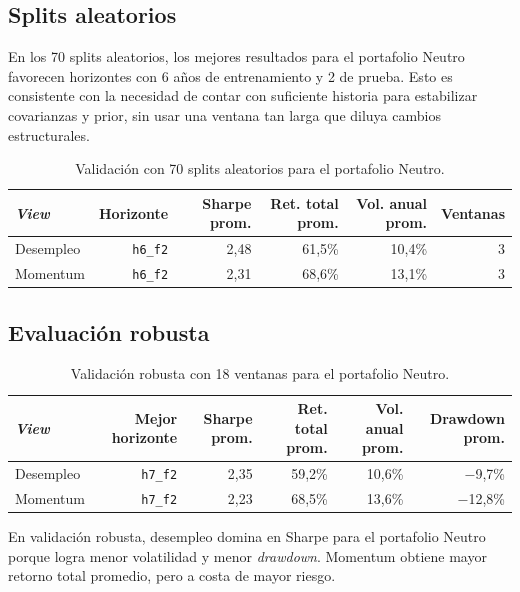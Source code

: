 \subsection*{Splits aleatorios}

En los 70 splits aleatorios, los mejores resultados para el portafolio Neutro
favorecen horizontes con 6 a\~nos de entrenamiento y 2 de prueba. Esto es
consistente con la necesidad de contar con suficiente historia para estabilizar
covarianzas y prior, sin usar una ventana tan larga que diluya cambios
estructurales.

\begin{table}[H]
\centering
\caption{Validaci\'on con 70 splits aleatorios para el portafolio Neutro.}
\label{tab:anexo4_bl_splits}
\small
\begin{tabular}{@{}lrrrrr@{}}
\toprule
\textit{View} & Horizonte & Sharpe prom. & Ret. total prom. & Vol. anual prom. & Ventanas \\
\midrule
Desempleo & \texttt{h6\_f2} & 2,48 & 61,5\% & 10,4\% & 3 \\
Momentum & \texttt{h6\_f2} & 2,31 & 68,6\% & 13,1\% & 3 \\
\bottomrule
\end{tabular}
\end{table}

\subsection*{Evaluaci\'on robusta}

\begin{table}[H]
\centering
\caption{Validaci\'on robusta con 18 ventanas para el portafolio Neutro.}
\label{tab:anexo4_bl_validacion_robusta}
\small
\begin{tabular}{@{}lrrrrr@{}}
\toprule
\textit{View} & Mejor horizonte & Sharpe prom. & Ret. total prom. & Vol. anual prom. & Drawdown prom. \\
\midrule
Desempleo & \texttt{h7\_f2} & 2,35 & 59,2\% & 10,6\% & $-$9,7\% \\
Momentum & \texttt{h7\_f2} & 2,23 & 68,5\% & 13,6\% & $-$12,8\% \\
\bottomrule
\end{tabular}
\end{table}

En validaci\'on robusta, desempleo domina en Sharpe para el portafolio Neutro
porque logra menor volatilidad y menor \textit{drawdown}. Momentum obtiene
mayor retorno total promedio, pero a costa de mayor riesgo.

